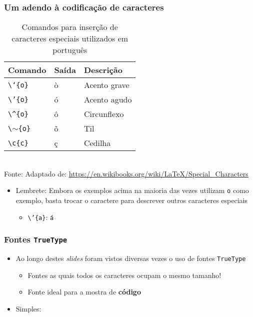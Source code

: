\begin{frame}[fragile] \frametitle{Um adendo à codificação de caracteres}
\vspace{-0.5cm}
\begin{table}[!t]
\centering
\caption{Comandos para inserção de caracteres especiais utilizados em português}
\begin{tabular}{l|l|l} \hline
\textbf{Comando} & \textbf{Saída} & \textbf{Descrição} \\ \hline
\texttt{\textbackslash{}`\{o\}}                  & ò & Acento grave \\ \hline
\texttt{\textbackslash{}'\{o\}}                  & ó & Acento agudo \\ \hline
\texttt{\textbackslash{}\textasciicircum{}\{o\}} & ô & Circunflexo  \\ \hline
\texttt{\textbackslash{}$\sim$\{o\}}             & õ & Til          \\ \hline
\texttt{\textbackslash{}c\{c\}}                  & ç & Cedilha      \\ \hline
\end{tabular}
\\ \vspace{0.2cm} \small{Fonte: Adaptado de: \url{https://en.wikibooks.org/wiki/LaTeX/Special_Characters}}
\end{table}

\begin{itemize}
	\item Lembrete: Embora os exemplos acima na maioria das vezes utilizam \texttt{o} como exemplo, basta trocar o caractere para descrever outros caracteres especiais
	\begin{itemize}
		\item \texttt{\textbackslash{}'\{a\}}: \texttt{á}
	\end{itemize}
\end{itemize}
\end{frame}

\begin{frame}[fragile] \frametitle{Fontes \texttt{TrueType}}
\begin{itemize}
	\item Ao longo destes \textit{slides} foram vistos diversas vezes o uso de fontes \texttt{TrueType}
	\begin{itemize}
		\item Fontes as quais todos os caracteres ocupam o mesmo tamanho!
		\item Fonte ideal para a mostra de \textbf{código}
	\end{itemize}
	\item Simples: 
\end{itemize}
\end{frame}

